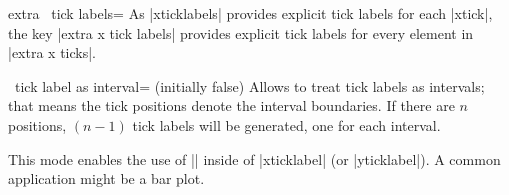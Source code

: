 \begin{pgfplotsxykey}{extra \x\ tick labels=}
    As |xticklabels| provides explicit tick labels for each |xtick|, the key
    |extra x tick labels| provides explicit tick labels for every element in
    |extra x ticks|.
\end{pgfplotsxykey}

\begin{pgfplotsxykey}{\x\ tick label as interval= (initially false)}
\label{key:pgfplots:ticklabelasinterval}
    Allows to treat tick labels as intervals; that means the tick positions
    denote the interval boundaries. If there are $n$ positions, $(n-1)$ tick
    labels will be generated, one for each interval.
\begin{codeexample}[]
\end{codeexample}
    This mode enables the use of |\nexttick| inside of |xticklabel| (or
    |yticklabel|). A common application might be a bar plot.
\begin{codeexample}[]
\end{codeexample}
\end{pgfplotsxykey}

